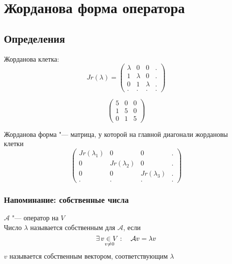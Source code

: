 \chapter{Жорданова форма оператора}

\section{Определения}

\begin{definition}
	Жорданова клетка:
	$$ Jr(\lambda) =
	\begin{pmatrix}
		\lambda & 0 & 0 & . \\
		1 & \lambda & 0 & . \\
		0 & 1 & \lambda & . \\
		. & . & . & .
	\end{pmatrix} $$
\end{definition}

\begin{eg}
	$$
	\begin{pmatrix}
		5 & 0 & 0 \\
		1 & 5 & 0 \\
		0 & 1 & 5
	\end{pmatrix} $$
\end{eg}

\begin{definition}
	Жорданова форма "--- матрица, у которой на главной диагонали жордановы клетки
	$$
	\begin{pmatrix}
		Jr(\lambda_1) & 0 & 0 & . \\
		0 & Jr(\lambda_2) & 0 & . \\
		0 & 0 & Jr(\lambda_3) & . \\
		. & . & . & .
	\end{pmatrix} $$
\end{definition}

\subsection{Напоминание: собственные числа}

\begin{definition}
	$ \mathcal{A} $ "--- оператор на $ V $ \\
	Число $ \lambda $ называется собственным для $ \mathcal{A} $, если
	$$ \exists\, \underset{v \ne 0}{v \in V} : \quad \mathcal{A}v = \lambda v $$
	$ v $ называется собственным вектором, соответствующим $ \lambda $
\end{definition}

